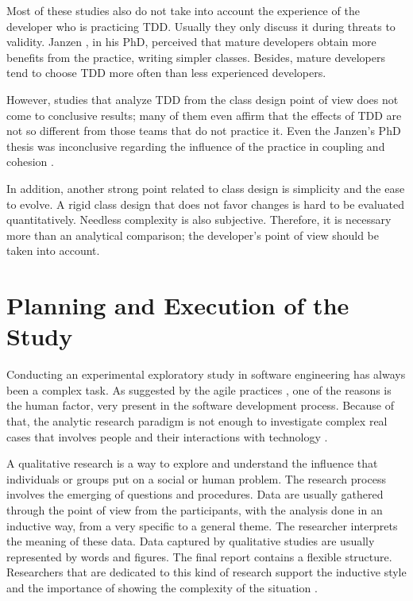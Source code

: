 \documentclass[times]{speauth}
\begin{document}
Most of these studies also do not take into account the experience
of the developer who is practicing TDD. Usually they only discuss it
during threats to validity. Janzen \cite{janzen-phd}, in his PhD, perceived
that mature developers obtain more benefits from the practice, writing simpler
classes. Besides, mature developers tend to choose TDD more often than
less experienced developers.

However, studies that analyze TDD from the class design point of view does not
come to conclusive results; many of them even affirm that the effects of TDD
are not so different from those teams that do not practice it. Even the Janzen's PhD
thesis was inconclusive regarding the influence of the practice in coupling
and cohesion \cite{janzen-phd}. 

In addition, another strong point related to class design is simplicity and
the ease to evolve. A rigid class design that does not favor changes is hard
to be evaluated quantitatively. Needless complexity is also subjective.
Therefore, it is necessary more than an analytical comparison; the
developer's point of view should be taken into account.

\section{Planning and Execution of the Study} 
\label{sec:planejamento}

Conducting an experimental exploratory study in software engineering has always
been a complex task. As suggested by the agile practices \cite{AgileManifesto}, 
one of the reasons is the human factor, very present in 
the software development process. Because of that, the analytic research
paradigm is not enough to investigate complex real cases that involves people
and their interactions with technology \cite{guidelines-case-study}.

A qualitative research is a way to explore and understand the influence that
individuals or groups put on a social or human problem. The research process
involves the emerging of questions and procedures. Data are usually gathered through
the point of view from the participants, with the analysis done in an inductive
way, from a very specific to a general theme. The researcher interprets
the meaning of these data. Data captured by qualitative studies are usually
represented by words and figures. The final report contains a flexible structure.
Researchers that are dedicated to this kind of research support the inductive style and
the importance of showing the complexity of the situation \cite{creswell}.
\end{document}
